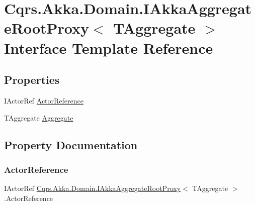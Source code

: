 \hypertarget{interfaceCqrs_1_1Akka_1_1Domain_1_1IAkkaAggregateRootProxy}{}\section{Cqrs.\+Akka.\+Domain.\+I\+Akka\+Aggregate\+Root\+Proxy$<$ T\+Aggregate $>$ Interface Template Reference}
\label{interfaceCqrs_1_1Akka_1_1Domain_1_1IAkkaAggregateRootProxy}
\subsection*{Properties}
\begin{DoxyCompactItemize}
\item 
I\+Actor\+Ref \hyperlink{interfaceCqrs_1_1Akka_1_1Domain_1_1IAkkaAggregateRootProxy_a82fada7255b8aae10e273561724e7098_a82fada7255b8aae10e273561724e7098}{Actor\+Reference}
\item 
T\+Aggregate \hyperlink{interfaceCqrs_1_1Akka_1_1Domain_1_1IAkkaAggregateRootProxy_a56fbd69562431a4b35864a90f446134b_a56fbd69562431a4b35864a90f446134b}{Aggregate}
\end{DoxyCompactItemize}


\subsection{Property Documentation}
\mbox{\label{interfaceCqrs_1_1Akka_1_1Domain_1_1IAkkaAggregateRootProxy_a82fada7255b8aae10e273561724e7098_a82fada7255b8aae10e273561724e7098}} 
\subsubsection{\texorpdfstring{Actor\+Reference}{ActorReference}}
{\footnotesize\ttfamily I\+Actor\+Ref \hyperlink{interfaceCqrs_1_1Akka_1_1Domain_1_1IAkkaAggregateRootProxy}{Cqrs.\+Akka.\+Domain.\+I\+Akka\+Aggregate\+Root\+Proxy}$<$ T\+Aggregate $>$.Actor\+Reference\hspace{0.3cm}{\ttfamily [get]}}

